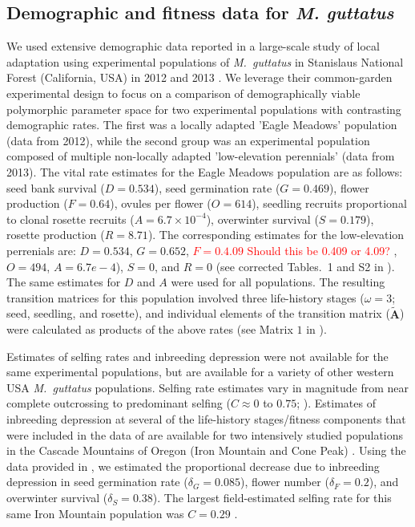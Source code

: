 \documentclass[11pt]{article}
\def\mbf#1{\mathbf{#1}}
\begin{document}
\subsection{Demographic and fitness data for {\itshape M. guttatus}} \label{subsec:MguttMethods}
We used extensive demographic data reported in a large-scale study of local adaptation using experimental populations of {\itshape M.~guttatus} in Stanislaus National Forest (California, USA) in 2012 and 2013 \citep{PetersonEtAl2016}. We leverage their common-garden experimental design to focus on a comparison of demographically viable polymorphic parameter space for two experimental populations with contrasting demographic rates. The first was a locally adapted 'Eagle Meadows' population (data from 2012), while the second group was an experimental population composed of multiple non-locally adapted 'low-elevation perennials' (data from 2013). The vital rate estimates for the Eagle Meadows population are as follows: seed bank survival ($D = 0.534$), seed germination rate ($G = 0.469$), flower production ($F = 0.64$), ovules per flower ($O = 614$), seedling recruits proportional to clonal rosette recruits ($A = 6.7 \times 10^{-4}$), overwinter survival ($S = 0.179$), rosette production ($R = 8.71$). The corresponding estimates for the low-elevation perrenials are: $D = 0.534$, $G = 0.652$, \textcolor{red}{$F = 0.4.09$ Should this be 0.409 or 4.09? }, $O = 494$, $A = 6.7e-4$), $S = 0$, and $R = 0$ (see corrected Tables.~1 and S2 in \citealt{PetersonEtAl2017}). The same estimates for $D$ and $A$ were used for all populations. The resulting transition matrices for this population involved three life-history stages ($\omega = 3$; seed, seedling, and rosette), and individual elements of the transition matrix ($\tilde{\mbf{A}}$) were calculated as products of the above rates (see Matrix $1$ in \citealt{PetersonEtAl2016}).

Estimates of selfing rates and inbreeding depression were not available for the same experimental populations, but are available for a variety of other western USA {\itshape M.~guttatus} populations. Selfing rate estimates vary in magnitude from near complete outcrossing to predominant selfing ($C \approx 0$ to $0.75$; \citealt{RitlandGanders1987, Ritland1990, Willis1999b}). Estimates of inbreeding depression at several of the life-history stages/fitness components that were included in the data of \citet{PetersonEtAl2016} are available for two intensively studied populations in the Cascade Mountains of Oregon (Iron Mountain and Cone Peak) \citet{Willis1993, Willis1999a, Willis1999b}. Using the data provided in \citet{Willis1993}, we estimated the proportional decrease due to inbreeding depression in seed germination rate ($\delta_{G} = 0.085$), flower number ($\delta_{F} = 0.2$), and overwinter survival ($\delta_{S} = 0.38$). The largest field-estimated selfing rate for this same Iron Mountain population was $C = 0.29$ \citep{Willis1993}.
\end{document}
